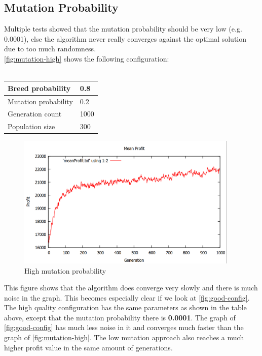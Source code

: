 \documentclass[fontsize=12pt,toc=bibliography, notitlepage]{scrreprt}
\begin{document}
\subsection{Mutation Probability}
\label{subsec:mutation-probability}
Multiple tests showed that the mutation probability should be very low (e.g. 0.0001), else the algorithm never really converges against the optimal solution due to too much randomness.\\
\autoref{fig:mutation-high} shows the following configuration:\\ \\
\begin{tabular}{ |l|l| }
	\hline
	Breed probability & 0.8 \\ \hline
	Mutation probability & 0.2 \\ \hline
	Generation count & 1000 \\ \hline
	Population size & 300 \\ \hline
\end{tabular}
\begin{figure}[H]
	\centering
	\includegraphics[width=400px]{images/mutation-high.png}
	\caption{High mutation probability}
	\label{fig:mutation-high}
\end{figure}
This figure shows that the algorithm does converge very slowly and there is much noise in the graph. This becomes especially clear if we look at \autoref{fig:good-config}.
The high quality configuration has the same parameters as shown in the table above, except that the mutation probability there is \textbf{0.0001}. The graph of \autoref{fig:good-config} has much less noise in it and converges much faster than the graph of \autoref{fig:mutation-high}. The low mutation approach also reaches a much higher profit value in the same amount of generations.
\end{document}
